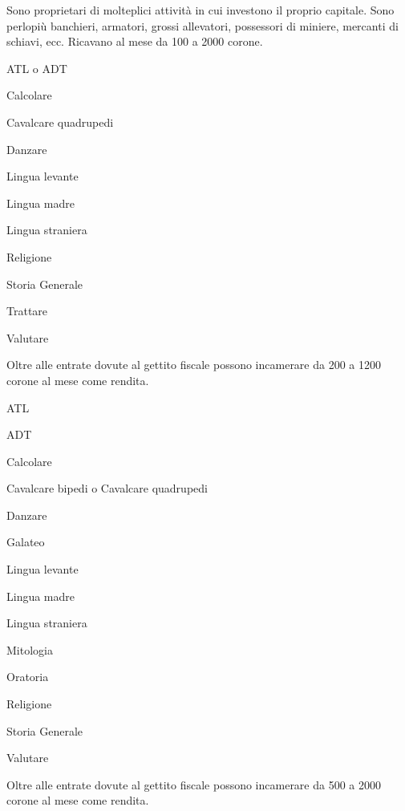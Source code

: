 
Sono proprietari di molteplici attivit\`a in cui investono il proprio
capitale. Sono perlopi\`u banchieri, armatori, grossi allevatori,
possessori di miniere, mercanti di schiavi, ecc.  Ricavano al mese da
100 a 2000 corone.

\begin{abilist}
\item ATL o ADT
\item Calcolare
\item Cavalcare quadrupedi
\item Danzare
\item Lingua levante
\item Lingua madre
\item Lingua straniera
\item Religione
\item Storia Generale
\item Trattare
\item Valutare
\end{abilist}


Oltre alle entrate dovute al gettito fiscale possono incamerare da 200
a 1200 corone al mese come rendita.

\begin{abilist}
\item ATL
\item ADT
\item Calcolare
\item Cavalcare bipedi o Cavalcare quadrupedi
\item Danzare
\item Galateo
\item Lingua levante
\item Lingua madre
\item Lingua straniera
\item Mitologia
\item Oratoria
\item Religione
\item Storia Generale
\item Valutare
\end{abilist}


Oltre alle entrate dovute al gettito fiscale possono incamerare da 500 a
2000 corone al mese come rendita.

